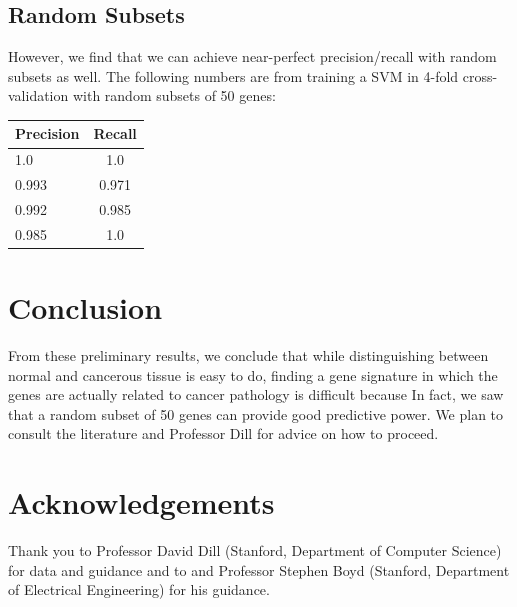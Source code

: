 \documentclass[11pt]{article}
\begin{document}
\subsection{Random Subsets}

However, we find that we can achieve near-perfect precision/recall with random subsets as well. The following numbers are from training a SVM in 4-fold cross-validation with random subsets of 50 genes:
\begin{tabular}{ l | c }
    Precision & Recall\\
  \hline 
    1.0 & 1.0 \\
    0.993 & 0.971 \\
    0.992 & 0.985 \\
    0.985 & 1.0 \\
  \hline
\end{tabular}
\section{Conclusion}
From these preliminary results, we conclude that while distinguishing between normal and cancerous tissue is easy to do, finding a gene signature in which the genes are actually related to cancer pathology is difficult because In fact, we saw that a random subset of 50 genes can provide good predictive power. We plan to consult the literature and Professor Dill for advice on how to proceed. 

\section{Acknowledgements}
Thank you to Professor David Dill (Stanford, Department of Computer Science) for data and guidance and to and Professor Stephen Boyd (Stanford, Department of Electrical Engineering) for his guidance.
\end{document}
